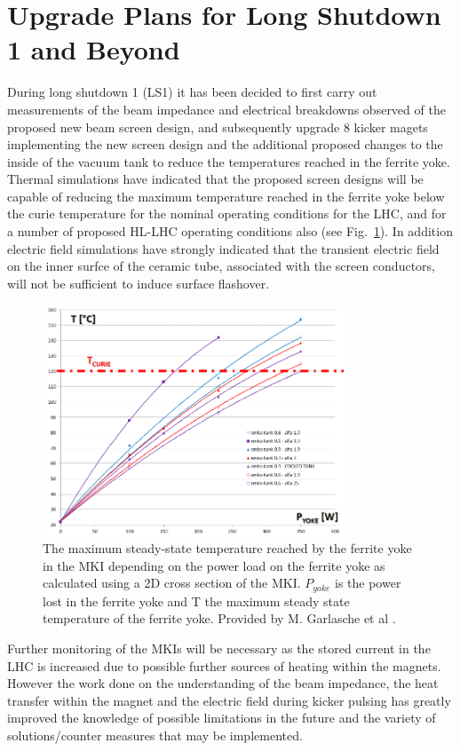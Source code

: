 \section{Upgrade Plans for Long Shutdown 1 and Beyond}

During long shutdown 1 (LS1) it has been decided to first carry out measurements of the beam impedance and electrical breakdowns observed of the proposed new beam screen design, and subsequently upgrade 8 kicker magets implementing the new screen design and the additional proposed changes to the inside of the vacuum tank to reduce the temperatures reached in the ferrite yoke. Thermal simulations have indicated that the proposed screen designs will be capable of reducing the maximum temperature reached in the ferrite yoke below the curie temperature for the nominal operating conditions for the LHC, and for a number of proposed HL-LHC operating conditions also (see Fig.~\ref{fig:pow-loss-stable-temp-mkis}). In addition electric field simulations have strongly indicated that the transient electric field on the inner surfce of the ceramic tube, associated with the screen conductors, will not be sufficient to induce surface flashover. 


\begin{figure}
\begin{center}
\includegraphics[width=0.8\textwidth]{LHC_MKI/figures/tempPowMarco.png}
\end{center}
\caption{The maximum steady-state temperature reached by the ferrite yoke in the MKI depending on the power load on the ferrite yoke as calculated using a 2D cross section of the MKI. $P_{yoke}$ is the power lost in the ferrite yoke and T the maximum steady state temperature of the ferrite yoke. Provided by M. Garlasche et al \cite{Garlasche:2dHeatEmisAll}.}
\label{fig:pow-loss-stable-temp-mkis}
\end{figure} 

Further monitoring of the MKIs will be necessary as the stored current in the LHC is increased due to possible further sources of heating within the magnets. However the work done on the understanding of the beam impedance, the heat transfer within the magnet and the electric field during kicker pulsing has greatly improved the knowledge of possible limitations in the future and the variety of solutions/counter measures that may be implemented. 
